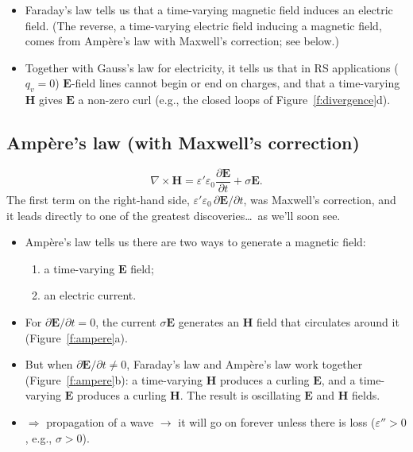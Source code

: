 \documentclass[11pt, oneside]{article}
\begin{document}
\begin{itemize}
	\item Faraday's law tells us that a time-varying magnetic field induces an electric field. (The reverse, a time-varying electric field inducing a magnetic field, comes from Amp\`ere's law with Maxwell's correction; see below.)
	\item Together with Gauss's law for electricity, it tells us that in RS applications ($q_v = 0$) $\mathbf{E}$-field lines cannot begin or end on charges, and that a time-varying $\mathbf{H}$ gives $\mathbf{E}$ a non-zero curl (e.g., the closed loops of Figure~\ref{f:divergence}d).
\end{itemize}

\subsection{Amp\`ere's law (with Maxwell's correction)}

\begin{equation}
	\label{e:ampere}
	\nabla\times\mathbf{H} = \varepsilon'\varepsilon_0\frac{\partial\mathbf{E}}{\partial t} + \sigma\mathbf{E}.
\end{equation}
The first term on the right-hand side, $\varepsilon'\varepsilon_0\,\partial\mathbf{E}/\partial t$, was Maxwell's correction, and it leads directly to one of the greatest discoveries\ldots\ as we'll soon see.
\begin{itemize}
	\item Amp\`ere's law tells us there are two ways to generate a magnetic field:
	\begin{enumerate}
		\item a time-varying $\mathbf{E}$ field;
		\item an electric current.
	\end{enumerate}
	\item For $\partial\mathbf{E}/\partial t = 0$, the current $\sigma\mathbf{E}$ generates an $\mathbf{H}$ field that circulates around it (Figure~\ref{f:ampere}a).
	\item But when $\partial\mathbf{E}/\partial t \ne 0$, Faraday's law and Amp\`ere's law work together (Figure~\ref{f:ampere}b): a time-varying $\mathbf{H}$ produces a curling $\mathbf{E}$, and a time-varying $\mathbf{E}$ produces a curling $\mathbf{H}$. The result is oscillating $\mathbf{E}$ and $\mathbf{H}$ fields.
	\item[] $\Rightarrow$ propagation of a wave $\rightarrow$ it will go on forever unless there is loss ($\varepsilon'' > 0$, e.g., $\sigma > 0$).
\end{itemize}
\end{document}
